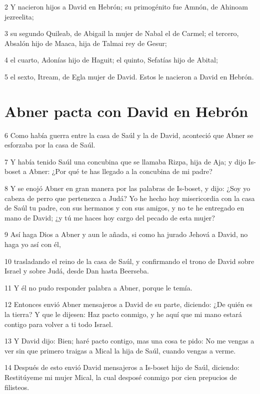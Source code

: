 \par 2 Y nacieron hijos a David en Hebrón; su primogénito fue Amnón, de Ahinoam jezreelita;
\par 3 su segundo Quileab, de Abigail la mujer de Nabal el de Carmel; el tercero, Absalón hijo de Maaca, hija de Talmai rey de Gesur;
\par 4 el cuarto, Adonías hijo de Haguit; el quinto, Sefatías hijo de Abital;
\par 5 el sexto, Itream, de Egla mujer de David. Estos le nacieron a David en Hebrón.

\section*{Abner pacta con David en Hebrón}

\par 6 Como había guerra entre la casa de Saúl y la de David, aconteció que Abner se esforzaba por la casa de Saúl.
\par 7 Y había tenido Saúl una concubina que se llamaba Rizpa, hija de Aja; y dijo Is-boset a Abner: ¿Por qué te has llegado a la concubina de mi padre?
\par 8 Y se enojó Abner en gran manera por las palabras de Is-boset, y dijo: ¿Soy yo cabeza de perro que pertenezca a Judá? Yo he hecho hoy misericordia con la casa de Saúl tu padre, con sus hermanos y con sus amigos, y no te he entregado en mano de David; ¿y tú me haces hoy cargo del pecado de esta mujer?
\par 9 Así haga Dios a Abner y aun le añada, si como ha jurado Jehová a David, no haga yo así con él,
\par 10 trasladando el reino de la casa de Saúl, y confirmando el trono de David sobre Israel y sobre Judá, desde Dan hasta Beerseba.
\par 11 Y él no pudo responder palabra a Abner, porque le temía.
\par 12 Entonces envió Abner mensajeros a David de su parte, diciendo: ¿De quién es la tierra? Y que le dijesen: Haz pacto conmigo, y he aquí que mi mano estará contigo para volver a ti todo Israel.
\par 13 Y David dijo: Bien; haré pacto contigo, mas una cosa te pido: No me vengas a ver sin que primero traigas a Mical la hija de Saúl, cuando vengas a verme.
\par 14 Después de esto envió David mensajeros a Is-boset hijo de Saúl, diciendo: Restitúyeme mi mujer Mical, la cual desposé conmigo por cien prepucios de filisteos. 
